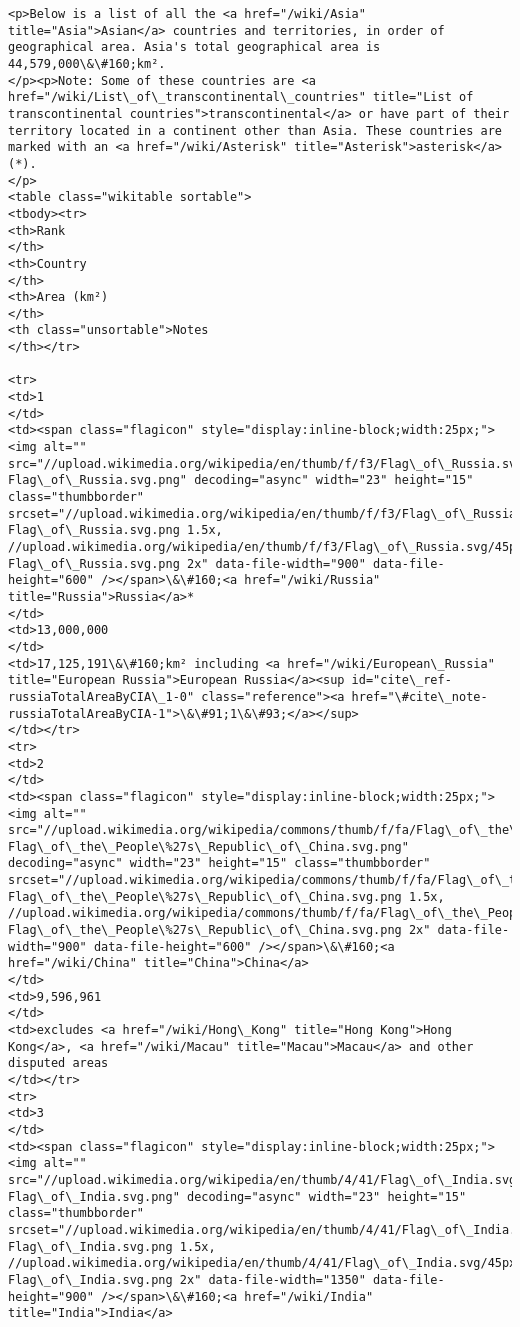 \documentclass[11pt]{article}
\begin{document}
\begin{Verbatim}[commandchars=\\\{\}]
<p>Below is a list of all the <a href="/wiki/Asia" title="Asia">Asian</a> countries and territories, in order of geographical area. Asia's total geographical area is 44,579,000\&\#160;km².
</p><p>Note: Some of these countries are <a href="/wiki/List\_of\_transcontinental\_countries" title="List of transcontinental countries">transcontinental</a> or have part of their territory located in a continent other than Asia. These countries are marked with an <a href="/wiki/Asterisk" title="Asterisk">asterisk</a> (*).
</p>
<table class="wikitable sortable">
<tbody><tr>
<th>Rank
</th>
<th>Country
</th>
<th>Area (km²)
</th>
<th class="unsortable">Notes
</th></tr>

<tr>
<td>1
</td>
<td><span class="flagicon" style="display:inline-block;width:25px;"><img alt="" src="//upload.wikimedia.org/wikipedia/en/thumb/f/f3/Flag\_of\_Russia.svg/23px-Flag\_of\_Russia.svg.png" decoding="async" width="23" height="15" class="thumbborder" srcset="//upload.wikimedia.org/wikipedia/en/thumb/f/f3/Flag\_of\_Russia.svg/35px-Flag\_of\_Russia.svg.png 1.5x, //upload.wikimedia.org/wikipedia/en/thumb/f/f3/Flag\_of\_Russia.svg/45px-Flag\_of\_Russia.svg.png 2x" data-file-width="900" data-file-height="600" /></span>\&\#160;<a href="/wiki/Russia" title="Russia">Russia</a>*
</td>
<td>13,000,000
</td>
<td>17,125,191\&\#160;km² including <a href="/wiki/European\_Russia" title="European Russia">European Russia</a><sup id="cite\_ref-russiaTotalAreaByCIA\_1-0" class="reference"><a href="\#cite\_note-russiaTotalAreaByCIA-1">\&\#91;1\&\#93;</a></sup>
</td></tr>
<tr>
<td>2
</td>
<td><span class="flagicon" style="display:inline-block;width:25px;"><img alt="" src="//upload.wikimedia.org/wikipedia/commons/thumb/f/fa/Flag\_of\_the\_People\%27s\_Republic\_of\_China.svg/23px-Flag\_of\_the\_People\%27s\_Republic\_of\_China.svg.png" decoding="async" width="23" height="15" class="thumbborder" srcset="//upload.wikimedia.org/wikipedia/commons/thumb/f/fa/Flag\_of\_the\_People\%27s\_Republic\_of\_China.svg/35px-Flag\_of\_the\_People\%27s\_Republic\_of\_China.svg.png 1.5x, //upload.wikimedia.org/wikipedia/commons/thumb/f/fa/Flag\_of\_the\_People\%27s\_Republic\_of\_China.svg/45px-Flag\_of\_the\_People\%27s\_Republic\_of\_China.svg.png 2x" data-file-width="900" data-file-height="600" /></span>\&\#160;<a href="/wiki/China" title="China">China</a>
</td>
<td>9,596,961
</td>
<td>excludes <a href="/wiki/Hong\_Kong" title="Hong Kong">Hong Kong</a>, <a href="/wiki/Macau" title="Macau">Macau</a> and other disputed areas
</td></tr>
<tr>
<td>3
</td>
<td><span class="flagicon" style="display:inline-block;width:25px;"><img alt="" src="//upload.wikimedia.org/wikipedia/en/thumb/4/41/Flag\_of\_India.svg/23px-Flag\_of\_India.svg.png" decoding="async" width="23" height="15" class="thumbborder" srcset="//upload.wikimedia.org/wikipedia/en/thumb/4/41/Flag\_of\_India.svg/35px-Flag\_of\_India.svg.png 1.5x, //upload.wikimedia.org/wikipedia/en/thumb/4/41/Flag\_of\_India.svg/45px-Flag\_of\_India.svg.png 2x" data-file-width="1350" data-file-height="900" /></span>\&\#160;<a href="/wiki/India" title="India">India</a>

\end{Verbatim}
\end{document}
